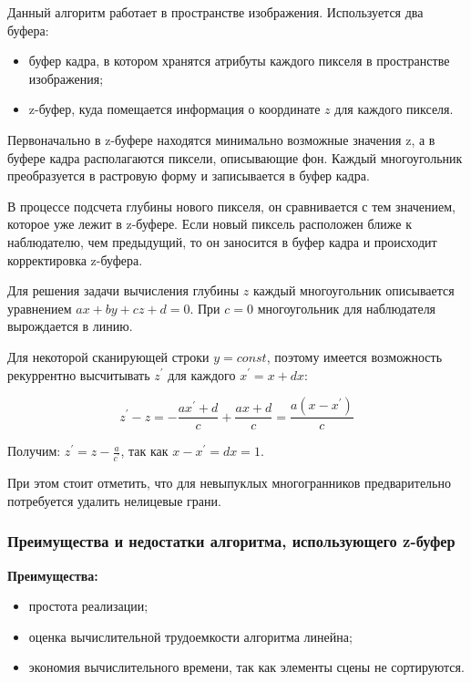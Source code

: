 \documentclass[a4paper,14pt, unknownkeysallowed]{extreport}
\begin{document}
Данный алгоритм работает в пространстве изображения. Используется два буфера:
\begin{itemize}
	\item буфер кадра, в котором хранятся атрибуты каждого пикселя в пространстве изображения;
	\item z-буфер, куда помещается информация о координате $z$ для каждого пикселя.
\end{itemize}

Первоначально в z-буфере находятся минимально возможные значения z, а в буфере кадра располагаются пиксели, описывающие фон. Каждый многоугольник преобразуется в растровую форму и записывается в буфер кадра.

В процессе подсчета глубины нового пикселя, он сравнивается с тем значением, которое уже лежит в z-буфере. Если новый пиксель расположен ближе к наблюдателю, чем предыдущий, то он заносится в буфер кадра и происходит корректировка z-буфера.

Для решения задачи вычисления глубины $z$ каждый многоугольник описывается уравнением $ax + by + cz + d = 0$. При $c = 0$ многоугольник для наблюдателя вырождается в линию. 

Для некоторой сканирующей строки $y = const$, поэтому имеется возможность рекуррентно высчитывать $z^\prime$ для каждого $x^\prime = x + dx$:

\begin{equation}
	z^\prime - z = -\frac{ax^\prime + d}{c} +\frac{ax + d}{c} = \frac{a(x - x^\prime)}{c}
\end{equation}

Получим: $z^\prime = z - \frac{a}{c^\prime}$, так как $x - x^\prime = dx = 1$.

При этом стоит отметить, что для невыпуклых многогранников предварительно потребуется удалить нелицевые грани.

\subsubsection{Преимущества и недостатки алгоритма, использующего z-буфер}

\textbf{Преимущества:}

\begin{itemize}
	\item простота реализации;
	\item оценка вычислительной трудоемкости алгоритма линейна;
	\item экономия вычислительного времени, так как элементы сцены не сортируются.
\end{itemize}
\end{document}
